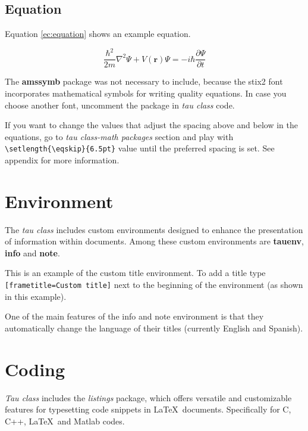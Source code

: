 \documentclass[9pt,a4paper,twoside]{tau}
\begin{document}
    \subsection{Equation}
    
        Equation \ref{ec:equation} shows an example equation. 

	\begin{equation} \label{ec:equation}
            \frac{\hbar^2}{2m}\nabla^2\Psi + V(\mathbf{r})\Psi = -i\hbar \frac{\partial\Psi}{\partial t}
	\end{equation} 

        The \textbf{amssymb} package was not necessary to include, because the stix2 font incorporates mathematical symbols for writing quality equations. In case you choose another font, uncomment the package in \textit{tau class} code.

        If you want to change the values that adjust the spacing above and below in the equations, go to \textit{tau class-math packages} section and play with \verb|\setlength{\eqskip}{6.5pt}| value until the preferred spacing is set. See appendix for more information.

\section{Environment}

    The \textit{tau class} includes custom environments designed to enhance the presentation of information within documents. Among these custom environments are \textbf{tauenv}, \textbf{info} and \textbf{note}.

    \begin{tauenv}[frametitle=Custom title]
        This is an example of the custom title environment. To add a title type \verb|[frametitle=Custom title]| next to the beginning of the environment (as shown in this example).
    \end{tauenv}

    One of the main features of the info and note environment is that they automatically change the language of their titles (currently English and Spanish).

\section{Coding}

    \textit{Tau class} includes the \textit{listings} package, which offers versatile and customizable features for typesetting code snippets in \LaTeX\ documents. Specifically for C, C++, \LaTeX\ and Matlab codes. 
\end{document}
